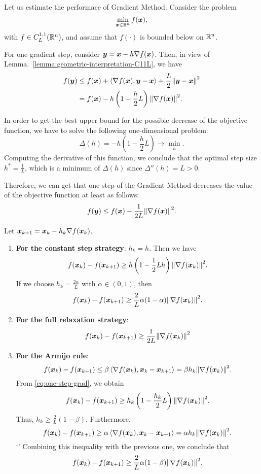 Let us estimate the performace of Gradient Method. Consider the problem
\begin{equation}\label{eq:grad-problem}
    \min_{\bm{x} \in \mathbb{R}^n} f(\bm{x}),
\end{equation}
with \(f \in C_{L}^{1,1}(\mathbb{R}^n)\), and assume that \(f(\cdot)\) is bounded below on \(\mathbb{R}^n\).

For one gradient step, consider \(\bm{y} = \bm{x} - h \nabla f(\bm{x})\). Then, in view of Lemma.~\ref{lemma:geometric-interpretation-C11L}, we have
\begin{equation}\label{eq:one-step-grad}
    \begin{aligned}
        f(\bm{y}) &\le f(\bm{x}) + \left\langle \nabla f(\bm{x}), \bm{y} - \bm{x} \right\rangle + \frac{L}{2} \norm{\bm{y} - \bm{x}}^2 \\
        &= f(\bm{x}) - h\left(1 - \frac{h}{2}L\right)\norm{\nabla f(\bm{x})}^2.
    \end{aligned}
\end{equation}

In order to get the best upper bound for the possible decrease of the objective function, we have to solve the following one-dimensional problem:
\[
    \Delta(h) = -h \left(1 - \frac{h}{2}L\right) \to \min_h.  
\]
Computing the derivative of this function, we conclude that the optimal step size \(h^* = \frac{1}{L}\), which is a minimum of \(\Delta(h)\) since 
\(\Delta''(h) = L > 0\).

Therefore, we can get that one step of the Gradient Method decreases the value of the objective function at least as follows:
\[
    f(\bm{y}) \le f(\bm{x}) - \frac{1}{2L} \norm{\nabla f(\bm{x})}^2.  
\]

Let \(\bm{x}_{k+1} = \bm{x}_k - h_k \nabla f(\bm{x}_k)\). 
\begin{enumerate}
    \item {
        \textbf{For the constant step strategy}: \(h_k = h\). Then we have
        \[
            f(\bm{x}_k) - f(\bm{x}_{k+1}) \ge h\left(1 - \frac{1}{2}Lh\right) \norm{\nabla f(\bm{x}_k)}^2.  
        \]
        If we choose \(h_k = \frac{2\alpha}{L}\) with \(\alpha \in (0, 1)\), then
        \[
            f(\bm{x}_k) - f(\bm{x}_{k+1}) \ge \frac{2}{L} \alpha (1 - \alpha) \norm{\nabla f(\bm{x}_k)}^2.  
        \]
    }
    \item {
        \textbf{For the full relaxation strategy}: 
        \[
            f(\bm{x}_k) - f(\bm{x}_{k+1}) \ge \frac{1}{2L} \norm{\nabla f(\bm{x}_k)}^2  
        \]
    }
    \item {
        \textbf{For the Armijo rule}:
        \[
            f(\bm{x}_k) - f(\bm{x}_{k+1}) \le \beta \left\langle \nabla f(\bm{x}_k), \bm{x}_k - \bm{x}_{k+1} \right\rangle = \beta h_k \norm{\nabla f(\bm{x}_k)}^2.  
        \]
        From \ref{eq:one-step-grad}, we obtain
        \[
            f(\bm{x}_k) - f(\bm{x}_{k+1}) \ge h_k \left(1 - \frac{h_k}{2}L\right) \norm{\nabla f(\bm{x}_k)}^2.  
        \]
        Thus, \(h_k \ge \frac{2}{L}(1 - \beta)\). Furthermore, 
        \[
            f(\bm{x}_k) - f(\bm{x}_{k+1}) \ge \alpha \left\langle \nabla f(\bm{x}_k), \bm{x}_k - \bm{x}_{k+1} \right\rangle = \alpha h_k \norm{\nabla f(\bm{x}_k)}^2.
        \] `'
        Combining this inequality with the previous one, we conclude that
        \[
            f(\bm{x}_k) - f(\bm{x}_{k+1}) \ge \frac{2}{L}\alpha (1 - \beta) \norm{\nabla f(\bm{x}_k)}^2.  
        \]
    }   
\end{enumerate}


